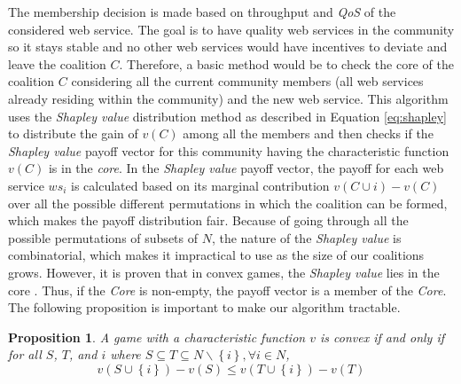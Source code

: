 \documentclass[10pt,journal,cspaper,compsoc]{IEEEtran}
\begin{document}
The membership decision is made based on throughput and \emph{QoS}
of the considered web service. The goal is to have quality web
services in the community so it stays stable and no other web
services would have incentives to deviate and leave the coalition
$C$. Therefore, a basic method would be to check the core of the
coalition $C$ considering all the current community members (all
web services already residing within the community) and the new
web service. This algorithm uses the \emph{Shapley value}
distribution method as described in Equation \ref{eq:shapley} to
distribute the gain of $v(C)$ among all the members and then
checks if the \emph{Shapley value} payoff vector for this
community having the characteristic function $v(C)$ is in the
\emph{core}. In the \emph{Shapley value} payoff vector, the payoff
for each web service $ws_i$ is calculated based on its marginal
contribution $v(C \cup {i}) - v(C)$ over all the possible
different permutations in which the coalition can be formed, which
makes the payoff distribution fair. Because of going through all
the possible permutations of subsets of $N$, the nature of the
\emph{Shapley value} is combinatorial, which makes it impractical
to use as the size of our coalitions grows. However, it is proven
that in convex games, the \emph{Shapley value} lies in the core
\cite{DBLP:conf/ijcai/GrecoMPS11, myerson1991game}. Thus, if the
\emph{Core} is non-empty, the payoff vector is a member of the
\emph{Core}. The following proposition is important to make our
algorithm tractable.


\newtheorem{theorem}{Proposition}
\begin{theorem}\label{proposition1}
A game with a characteristic function $v$
is convex if and only if for all $S$, $T$, and $i$ where $S
\subseteq T \subseteq N \backslash \left\{i\right\}, \forall i \in
N$,
\begin{equation}\label{eq:convex_snow}
v(S \cup \left\{i\right\}) - v(S) \leq v (T \cup \left\{i\right\}) - v(T)
\end{equation}
\end{theorem}

\end{document}
